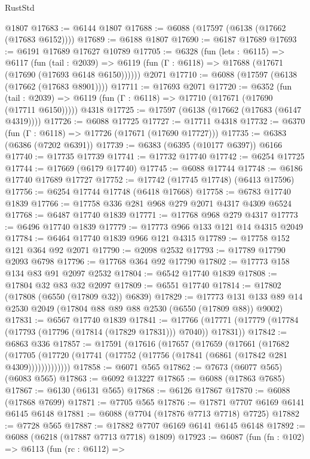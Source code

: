 \begin{lexlean}{RustStd}
\begin{coremodule}
    @1807
@17683 := @6144 @1807
@17688 := @6088 (@17597 (@6138 (@17662 (@17683 @6152))))
@17689 := @6188 @1807
@17690 := @6187 @17689
@17693 := @6191 @17689 @17627 @10789
@17705 := @6328
    (fun (lets : @6115) =>
    @6117
      (fun (tail : @2039) =>
      @6119 (fun (Γ : @6118) => @17688 (@17671 (@17690 (@17693 @6148 @6150))))))
    @2071
@17710 := @6088 (@17597 (@6138 (@17662 (@17683 @8901))))
@17711 := @17693 @2071
@17720 := @6352
    (fun (tail : @2039) => @6119 (fun (Γ : @6118) => @17710 (@17671 (@17690 (@17711 @6150)))))
    @4318
@17725 := @17597 (@6138 (@17662 (@17683 (@6147 @4319))))
@17726 := @6088 @17725
@17727 := @17711 @4318
@17732 := @6370 (fun (Γ : @6118) => @17726 (@17671 (@17690 @17727)))
@17735 := @6383 (@6386 (@7202 @6391))
@17739 := @6383 (@6395 (@10177 @6397)) @6166
@17740 := @17735 @17739
@17741 := @17732 @17740
@17742 := @6254 @17725
@17744 := @17669 (@6179 @17740)
@17745 := @6088 @17744
@17748 := @6186 @17740 @17689 @17727
@17752 := @17742 (@17745 @17748) (@6413 @17596)
@17756 := @6254 @17744 @17748 (@6418 @17668)
@17758 := @6783 @17740 @1839
@17766 := @17758 @336 @281 @968 @279 @2071 @4317 @4309 @6524
@17768 := @6487 @17740 @1839
@17771 := @17768 @968 @279 @4317
@17773 := @6496 @17740 @1839
@17779 := @17773 @966 @133 @121 @14 @4315 @2049
@17784 := @6464 @17740 @1839 @966 @121 @4315
@17789 := @17758 @152 @121 @364 @92 @2071
@17790 := @2098 @2532
@17793 := @17789 @17790 @2093 @6798
@17796 := @17768 @364 @92 @17790
@17802 := @17773 @158 @134 @83 @91 @2097 @2532
@17804 := @6542 @17740 @1839
@17808 := @17804 @32 @83 @32 @2097
@17809 := @6551 @17740
@17814 := @17802 (@17808 (@6550 (@17809 @32)) @6839)
@17829 := @17773 @131 @133 @89 @14 @2530 @2049 (@17804 @88 @89 @88 @2530 (@6550 (@17809 @88)) @9002)
@17831 := @6567 @17740 @1839
@17841 := @17766 (@17771 (@17779 (@17784 (@17793 (@17796 (@17814 (@17829 @17831))) @7040)) @17831))
@17842 := @6863 @336
@17857 := @17591
    (@17616
      (@17657
        (@17659
          (@17661
            (@17682
              (@17705 (@17720 (@17741 (@17752 (@17756 (@17841 (@6861 (@17842 @281 @4309)))))))))))))
@17858 := @6071 @565
@17862 := @7673 (@6077 @565) (@6083 @565)
@17863 := @6092 @13227
@17865 := @6088 (@17863 @7685)
@17867 := @6130 (@6131 @565)
@17868 := @6126 @17867
@17870 := @6088 (@17868 @7699)
@17871 := @7705 @565
@17876 := @17871 @7707 @6169 @6141 @6145 @6148
@17881 := @6088 (@7704 (@17876 @7713 @7718) @7725)
@17882 := @7728 @565
@17887 := @17882 @7707 @6169 @6141 @6145 @6148
@17892 := @6088 (@6218 (@17887 @7713 @7718) @1809)
@17923 := @6087
    (fun (fn : @102) =>
    @6113
      (fun (rc : @6112) =>

\end{coremodule}
\end{lexlean}
